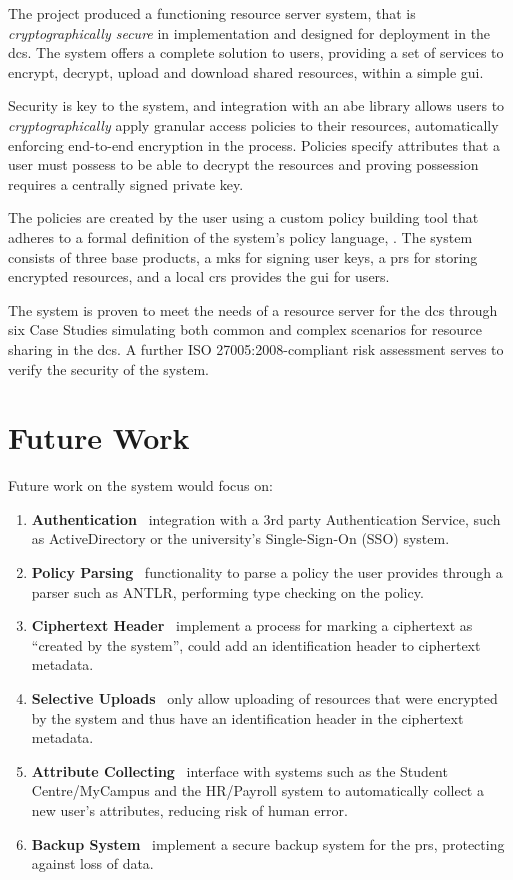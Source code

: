 The project produced a functioning resource server system, that is \textit{cryptographically secure} in implementation and designed for deployment in the \acrlong{dcs}. The \theResServer system offers a complete solution to users, providing a set of services to encrypt, decrypt, upload and download shared resources, within a simple \acrshort{gui}.

Security is key to the \theResServer system, and integration with an \acrfull{abe} library allows users to \textit{cryptographically} apply granular access policies to their resources, automatically enforcing end-to-end encryption in the process. Policies specify attributes that a user must possess to be able to decrypt the resources and proving possession requires a centrally signed private key.

The policies are created by the user using a custom policy building tool that adheres to a formal definition of the system's policy language, \thePolicyLang. The system consists of three base products, a \acrfull{mks} for signing user keys, a \acrfull{prs} for storing encrypted resources, and a local \acrfull{crs} provides the \acrshort{gui} for users.

The \theResServer system is proven to meet the needs of a resource server for the \acrfull{dcs} through six Case Studies simulating both common and complex scenarios for resource sharing in the \acrshort{dcs}. A further ISO 27005:2008-compliant risk assessment serves to verify the security of the system.

\section{Future Work}
\label{sec:concl_future_work}

Future work on the \theResServer system would focus on:
\begin{enumerate}
  \item
    \textbf{Authentication} \textemdash\ integration with a 3rd party Authentication Service, such as ActiveDirectory or the university's Single-Sign-On (SSO) system.
  \item
    \textbf{Policy Parsing} \textemdash\ functionality to parse a policy the user provides through a parser such as ANTLR, performing type checking on the policy.
  \item
    \textbf{Ciphertext Header} \textemdash\ implement a process for marking a ciphertext as ``created by the \theResServer system'', could add an identification header to ciphertext metadata.
  \item
    \textbf{Selective Uploads} \textemdash\ only allow uploading of resources that were encrypted by the \theResServer system and thus have an identification header in the ciphertext metadata.
  \item
    \textbf{Attribute Collecting} \textemdash\ interface with systems such as the Student Centre/MyCampus and the HR/Payroll system to automatically collect a new user's attributes, reducing risk of human error.
  \item
    \textbf{Backup System} \textemdash\ implement a secure backup system for the \acrfull{prs}, protecting against loss of data.
\end{enumerate}
